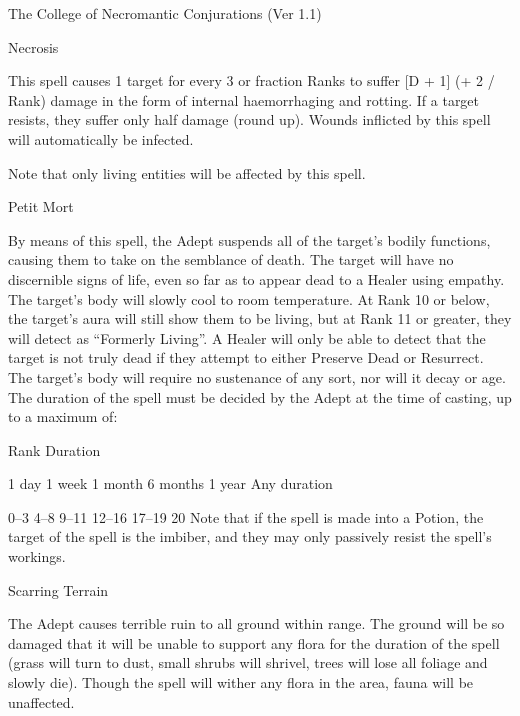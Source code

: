 \begin{Chapter}{The College of Necromantic Conjurations (Ver 1.1)}
\begin{spell}[S-9]{Necrosis}
\begin{effects}
This spell causes 1 target for every 3 or fraction Ranks to suffer [D
  + 1] (+ 2 / Rank) damage in the form of internal haemorrhaging and
rotting.  If a target resists, they suffer only half damage (round
up). Wounds inflicted by this spell will automatically be infected.

Note that only living entities will be affected by this spell.
\end{effects}
\end{spell}

\begin{spell}[S-10]{Petit Mort}

\begin{effects}
By means of this spell, the Adept suspends all of the target’s bodily
functions, causing them to take on the semblance of death.  The target
will have no discernible signs of life, even so far as to appear dead
to a Healer using empathy.  The target’s body will slowly cool to room
temperature.  At Rank 10 or below, the target’s aura will still show
them to be living, but at Rank 11 or greater, they will detect as
“Formerly Living”.  A Healer will only be able to detect that the
target is not truly dead if they attempt to either Preserve Dead or
Resurrect.  The target’s body will require no sustenance of any sort,
nor will it decay or age. The duration of the spell must be decided by
the Adept at the time of casting, up to a maximum of:

Rank  Duration 

1 day 
1 week 
1 month 
6 months 
1 year 
Any duration 

0–3 
4–8 
9–11 
12–16 
17–19 
20 
Note  that  if  the  spell  is  made  into  a  Potion,  the 
target of the spell is the imbiber, and they may only 
passively resist the spell’s workings. 

\end{effects}
\end{spell}

\begin{spell}[S-11]{Scarring Terrain}

\begin{effects}
The Adept causes terrible ruin to all ground within range.  The ground
will be so damaged that it will be unable to support any flora for the
duration of the spell (grass will turn to dust, small shrubs will
shrivel, trees will lose all foliage and slowly die).  Though the
spell will wither any flora in the area, fauna will be unaffected.
\end{effects}
\end{spell}


\end{Chapter}
